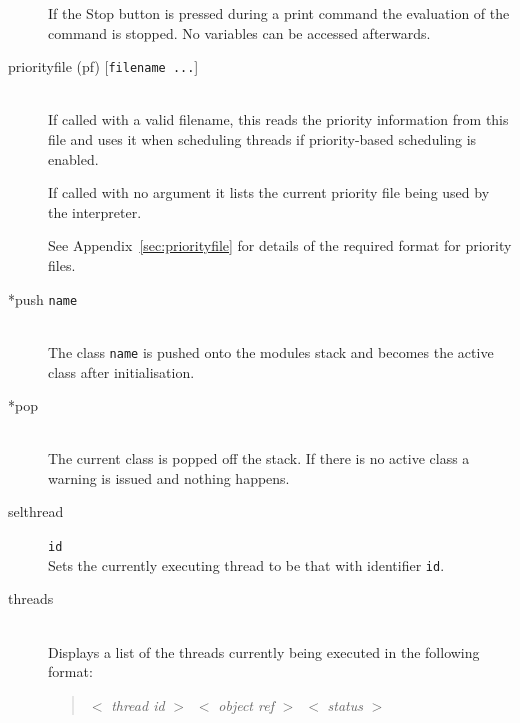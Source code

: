 \documentclass[\pformat,12pt]{article}
\newcommand{\guicmd}[1]{{\sf #1}}
\begin{document}
\begin{description}
  If the \guicmd{Stop} button
  is pressed during a 
  print command the evaluation of the command is stopped. No variables
  can be accessed afterwards.
  
\item[priorityfile (pf) \mbox{[{\tt filename ...}]}]
  \mbox{}\\
  If called with a valid filename, this reads the priority information
  from this file and uses it when scheduling threads if
  priority-based scheduling is enabled.

  If called with no argument it lists the current priority file being
  used by the interpreter.

  See Appendix~\ref{sec:priorityfile} for details of the required
  format for priority files.

\item[*push {\tt name}] \mbox{}\\
  The class {\tt name}\/ is pushed onto the modules stack and becomes
  the active class after initialisation.
  
\item[*pop] \mbox{}\\
  The current class is popped off the stack. 
If there is no active class a warning is issued and
  nothing happens.

\item[selthread]\texttt{id}\mbox{}\\
  Sets the currently executing thread to be that with identifier
  \texttt{id}.


\item[threads]\mbox{}\\
  Displays a list of the threads currently being executed in the
following format:

\begin{quote}
  $<$ \textit{thread id} $>$\ $<$ \textit{object ref} $>$\ $<$
\textit{status} $>$
\end{quote}


\end{description}
\end{document}
